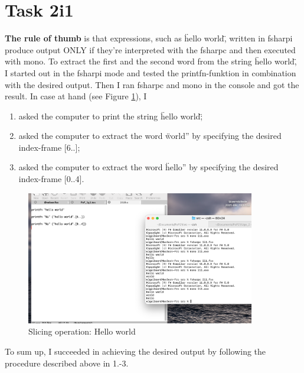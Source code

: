 \documentclass{article}
\begin{document}
\section{Task 2i1}
\textbf{The rule of thumb} is that expressions, such as \"hello world\", written in fsharpi produce output ONLY if they're interpreted with the fsharpc and then executed with mono.
To extract the first and the second word from the string \"hello world\", I started out in the fsharpi mode and tested the printfn-funktion in combination with the desired output. Then I ran fsharpc and mono in the console and got the result. In case at hand (see Figure \ref{output1}), I
\begin{enumerate}
\item asked the computer to print the string \"hello world\";
\item asked the computer to extract the word \"world'' by specifying the desired index-frame [6..];
\item asked the computer to extract the word \"hello'' by specifying the desired index-frame [0..4].
\end{enumerate}

\begin{figure}[h!]
  \centering
 \includegraphics [width=10cm]{Figure_1.png}
 \caption{Slicing operation: Hello world}
 \label{output1}
\end{figure}
To sum up, I succeeded in achieving the desired output by following the procedure described above in 1.-3.
\end{document}
